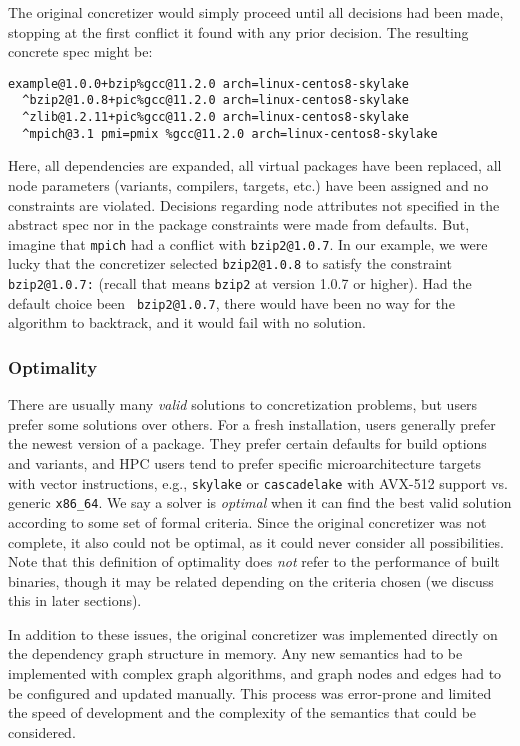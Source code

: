 The original concretizer would simply proceed until all decisions had been made,
stopping at the first conflict it found with any prior decision. The
resulting concrete spec might be:
\begin{verbatim}
example@1.0.0+bzip%gcc@11.2.0 arch=linux-centos8-skylake
  ^bzip2@1.0.8+pic%gcc@11.2.0 arch=linux-centos8-skylake
  ^zlib@1.2.11+pic%gcc@11.2.0 arch=linux-centos8-skylake
  ^mpich@3.1 pmi=pmix %gcc@11.2.0 arch=linux-centos8-skylake
\end{verbatim}
Here, all dependencies are expanded, all virtual packages have been replaced, all node
parameters (variants, compilers, targets, etc.) have been assigned and no constraints
are violated. Decisions regarding node attributes not specified in the abstract spec nor
in the package constraints were made from defaults. But, imagine that {\tt mpich} had a
conflict with {\tt bzip2@1.0.7}. In our example, we were lucky that the concretizer
selected {\tt bzip2@1.0.8} to satisfy the constraint {\tt bzip2@1.0.7:} (recall that
means \texttt{bzip2} at version 1.0.7 or higher). Had the default choice been {\tt
  bzip2@1.0.7}, there would have been no way for the algorithm to backtrack, and it would
fail with no solution.

\subsubsection{Optimality}
There are usually many {\it valid} solutions to concretization problems, but users
prefer some solutions over others. For a fresh installation, users generally prefer the
newest version of a package. They prefer certain defaults for build options and
variants, and HPC users tend to prefer specific microarchitecture targets with vector
instructions, e.g., {\tt skylake} or {\tt cascadelake} with AVX-512 support vs. generic
{\tt x86\_64}. We say a solver is {\it optimal} when it can find the best valid solution
according to some set of formal criteria. Since the original concretizer was not
complete, it also could not be optimal, as it could never consider all possibilities.
Note that this definition of optimality does {\it not} refer to the performance of built
binaries, though it may be related depending on the criteria chosen (we discuss this
in later sections).

In addition to these issues, the original concretizer was implemented directly on the
dependency graph structure in memory. Any new semantics had to be implemented with
complex graph algorithms, and graph nodes and edges had to be configured and updated
manually. This process was error-prone and limited the speed of development and the
complexity of the semantics that could be considered.
